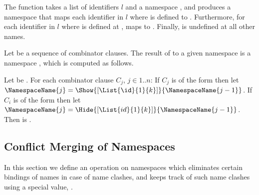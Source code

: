\documentclass[makeidx]{article}
\begin{document}
{\LMHash{}%
The function
takes a list of identifiers $l$ and a namespace ,
and produces a namespace  that
maps each identifier \id{} in $l$
where  is defined
to .
Furthermore, for each identifier \id{} in $l$
where  is defined at \code{\id=},
 maps \code{\id=} to .
Finally,  is undefined at all other names.

\LMHash{}%
Let  be a sequence of combinator clauses.
The result of
to a given namespace 
is a namespace ,
which is computed as follows.

\LMHash{}%
Let  be .
For each combinator clause $C_j$, $j \in 1 .. n$:
If $C_j$ is of the form  then let
$\NamespaceName{j} = \Show{[\List{\id}{1}{k}]}{\NamespaceName{j-1}}$.
If $C_i$ is of the form  then let
$\NamespaceName{j} = \Hide{[\List{id}{1}{k}]}{\NamespaceName{j-1}}$.
Then  is .




\subsection{Conflict Merging of Namespaces}

\LMHash{}%
In this section we define an operation on namespaces
which eliminates certain bindings of names in case of name clashes,
and keeps track of such name clashes using a special value,
\Index{\ConflictValue}.

}
\end{document}
